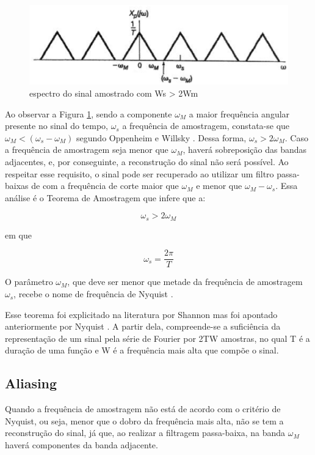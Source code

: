 \begin{figure}[h]
	\centering
    \includegraphics[scale=0.5]{figuras/fig03.eps}
	\caption{espectro do sinal amostrado com Ws > 2Wm \cite{oppenheim2010sinais}}
	\label{fig03}
\end{figure}

Ao observar a Figura \ref{fig03}, sendo a componente $\omega_M$ a maior frequência angular presente no sinal do tempo, $\omega_s$ a frequência de amostragem, constata-se que $\omega_M<(\omega_s-\omega_M)$ segundo Oppenheim e Willsky \cite{oppenheim2010sinais}. Dessa forma, $\omega_s>2\omega_M$. Caso a frequência de amostragem seja menor que $\omega_M$, haverá sobreposição das bandas adjacentes, e, por conseguinte, a reconstrução do sinal não será possível. Ao respeitar esse requisito, o sinal pode ser recuperado ao utilizar um filtro passa-baixas de com a frequência de corte maior que $\omega_M$ e menor que $\omega_M-\omega_s$.
Essa análise é o Teorema de Amostragem que infere que a:

\begin{equation} \label{eq:01}
\omega_s>2\omega_M
\end{equation}

em que

\begin{equation} \label{eq:02}
\omega_s=\frac{2\pi}{T}
\end{equation}

O parâmetro $\omega_M$, que deve ser menor que metade da frequência de amostragem $\omega_s$, recebe o nome de frequência de Nyquist \cite{oppenheim2010sinais}.
\par
Esse teorema foi explicitado na literatura por Shannon \cite{Shannon} mas foi apontado anteriormente por Nyquist \cite{nyquist}. A partir dela, compreende-se a suficiência da representação de um sinal pela série de Fourier por 2TW amostras, no qual T é a duração de uma função e W é a frequência mais alta que compõe o sinal.

\subsection{Aliasing}
Quando a frequência de amostragem não está de acordo com o critério de Nyquist, ou seja, menor que o dobro da frequência mais alta, não se tem a reconstrução do sinal, já que, ao realizar a filtragem passa-baixa, na banda $\omega_M$ haverá componentes da banda adjacente.

